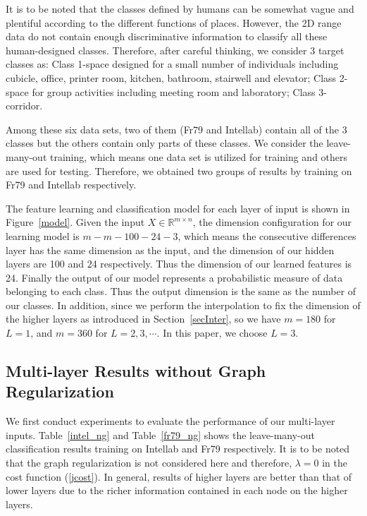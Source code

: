 \documentclass[letterpaper, 10 pt, conference]{ieeeconf}  %
\begin{document}
It is to be noted that the classes defined by humans can be somewhat vague and plentiful according to the different functions of places. However, the 2D range data do not contain enough discriminative information to classify all these human-designed classes.  Therefore, after careful thinking, we consider 3 target classes as: Class 1-space designed for a small number of individuals including cubicle, office, printer room, kitchen, bathroom, stairwell and elevator; Class 2-space for group activities including meeting room and laboratory; Class 3-corridor.

Among these six data sets, two of them (Fr79 and Intellab) contain all of the 3 classes but the others contain only parts of these classes. We consider the leave-many-out training, which means one data set is utilized for training and others are used for testing. Therefore, we obtained two groups of results by training on Fr79 and Intellab respectively.

The feature learning and classification model for each layer of input is shown in Figure~\ref{model}. Given the input $X\in \mathbb{R}^{m\times n}$, the dimension configuration for our learning model is $m-m-100-24-3$, which means the consecutive differences layer has the same dimension as the input, and the dimension of our hidden layers are 100 and 24 respectively. Thus the dimension of our learned features is 24. Finally the output of our model represents a probabilistic measure of data belonging to each class. Thus the output dimension is the same as the number of our classes. In addition, since we perform the interpolation to fix the dimension of the higher layers as introduced in Section~\ref{secInter}, so we have $m=180$ for $L=1$, and $m=360$ for $L=2,3,\cdots$. In this paper, we choose $L=3$.

\subsection{Multi-layer Results without Graph Regularization}

We first conduct experiments to evaluate the performance of our multi-layer inputs. Table~\ref{intel_ng} and Table~\ref{fr79_ng} shows the leave-many-out classification results training on Intellab and Fr79 respectively. It is to be noted that the graph regularization is not considered here and therefore, $\lambda=0$ in the cost function (\ref{jcost}). In general, results of higher layers are better than that of lower layers due to the richer information contained in each node on the higher layers.
\end{document}
